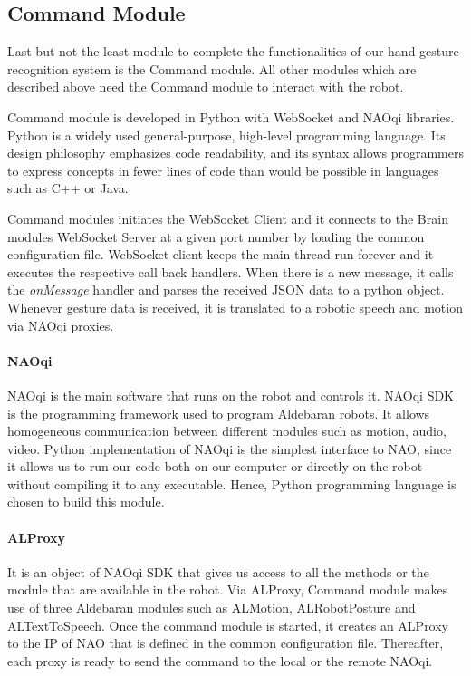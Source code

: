 \subsection{Command Module} Last but not the least module to complete the functionalities of our hand gesture recognition system is the Command module. All other modules which are described above need the Command module to interact with the robot.

Command module is developed in Python with WebSocket and NAOqi libraries. Python is a widely used general-purpose, high-level programming language. Its design philosophy emphasizes code readability, and its syntax allows programmers to express concepts in fewer lines of code than would be possible in languages such as C++ or Java. 

Command modules initiates the WebSocket Client and it connects to the Brain modules WebSocket Server at a given port number by loading the common configuration file. WebSocket client keeps the main thread run forever and it executes the respective call back handlers. When there is a new message, it calls the \textit{onMessage} handler and parses the received JSON data to a python object. Whenever gesture data is received, it is translated to a robotic speech and motion via NAOqi proxies.

\paragraph*{NAOqi} NAOqi is the main software that runs on the robot and controls it. NAOqi SDK is the programming framework used to program Aldebaran robots. It allows homogeneous communication between different modules such as motion, audio, video. Python implementation of NAOqi is the simplest interface to NAO, since it allows us to run our code both on our computer or directly on the robot without compiling it to any executable. Hence, Python programming language is chosen to build this module. 

\paragraph*{ALProxy} It is an object of NAOqi SDK that gives us access to all the methods or the module that are available in the robot. Via ALProxy, Command module makes use of three Aldebaran modules such as ALMotion, ALRobotPosture and ALTextToSpeech. Once the command module is started, it creates an ALProxy to the IP of NAO that is defined in the common configuration file. Thereafter, each proxy is ready to send the command to the local or the remote NAOqi.

